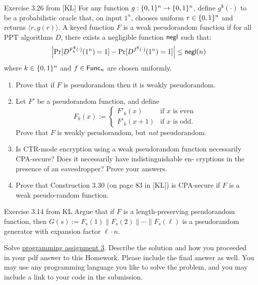\documentclass[a4paper,10pt]{article}
\begin{document}
\begin{nquestion}{4}{Exercise 3.26 from [KL]}
For any function $g : \{0,1\}^n \rightarrow \{0,1\}^n$, define $g^\$(\cdot)$ to be a probabilistic oracle that, on input $1^n$, chooses uniform $r \in \{0,1\}^n$ and returns $\langle r, g(r) \rangle$. A keyed function $F$ is a weak pseudorandom function if for all PPT algorithms $D$, there exists a negligible function $\mathsf{negl}$ such that:
\[
\left| \Pr[D^{F_k^{\$}(\cdot)}(1^n) = 1] - \Pr[D^{f^\$(\cdot)}(1^n) = 1] \right| \leq \mathsf{negl}(n)
 \]
where $k \in \{0, 1\}^n$ and $f \in \mathsf{Func}_n$ are chosen uniformly.
\begin{enumerate}
\item Prove that if $F$ is pseudorandom then it is weakly pseudorandom.
\item Let $F'$ be a pseudorandom function, and define
\[
F_k(x) := \begin{cases} F'_k(x) & \text{if $x$ is even}\\
F'_k(x+1) & \text{if $x$ is odd}.
\end{cases}
\]
Prove that $F$ is weakly pseudorandom, but \emph{not} pseudorandom.
\item Is CTR-mode encryption using a weak pseudorandom function necessarily CPA-secure? Does it necessarily have indistinguishable en- cryptions in the presence of an eavesdropper? Prove your answers.
\item Prove that Construction 3.30 (on page 83 in [KL]) is CPA-secure if $F$ is a weak pseudo-random function.
\end{enumerate}
\end{nquestion}
\begin{solution}
\end{solution}

\begin{nquestion}{2}{Exercise 3.14 from KL}
Argue that if $F$ is a length-preserving pseudorandom function, then $G(s):=F_s(1) \| F_s(2) \| \cdots \| F_s(\ell)$ is a pseudorandom generator with expansion factor $\ell \cdot n$.
\end{nquestion}

\begin{solution}
\end{solution}




\begin{programming}{8}
Solve \href{https://www.coursera.org/learn/cryptography/supplement/zaK8x/programming-assignment-3}{programming assignment 3}. Describe the solution and how you proceeded in your pdf answer to this Homework. Please include the final answer as well. You may use any programming language you like to solve the problem, and you may include a link to your code in the submission.
\end{programming}

\begin{solution}
\end{solution}
\end{document}
